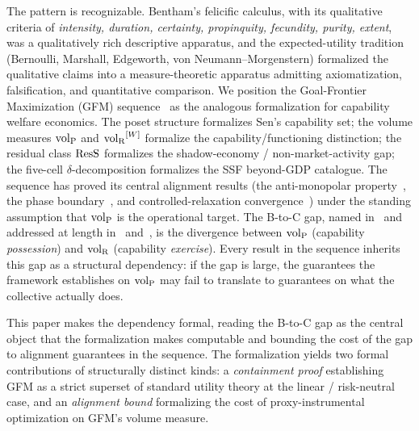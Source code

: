 The pattern is recognizable.  Bentham's felicific
calculus, with its qualitative criteria of \emph{intensity,
duration, certainty, propinquity, fecundity, purity, extent},
was a qualitatively rich descriptive apparatus, and the expected-utility tradition (Bernoulli,
Marshall, Edgeworth, von Neumann--Morgenstern) formalized the
qualitative claims into a measure-theoretic apparatus admitting
axiomatization, falsification, and quantitative comparison.  We
position the Goal-Frontier Maximization (GFM)
sequence~\citep{lasser2026gfm,lasser2026poset,lasser2026horizon,lasser2026scm,lasser2026exo,lasser2026phase,lasser2026wamura,lasser2026paper8a,lasser2026paper8b}
as the analogous formalization for capability welfare economics.
The poset structure formalizes Sen's capability set; the volume
measures ${\operatorname{vol}_{\mathrm{P}}}$ and ${\operatorname{vol}_{\mathrm{R}}}^{[W]}$ formalize the capability/functioning
distinction; the residual class $\mathrm{ResS}$ formalizes the
shadow-economy / non-market-activity gap; the five-cell
$\delta$-decomposition formalizes the SSF beyond-GDP catalogue.
The sequence has proved its central alignment results (the
anti-monopolar property~\citep[Horizon~Aware]{lasser2026horizon},
the phase boundary~\citep[Phase~Redundancy]{lasser2026phase}, and
controlled-relaxation
convergence~\citep[Controlled~Relaxation]{lasser2026wamura}) under
the standing assumption that ${\operatorname{vol}_{\mathrm{P}}}$ is the operational target.
The B-to-C gap, named in~\citep[Section~7]{lasser2026gfm} and
addressed at length in~\citep[Revealed~Sacrifice]{lasser2026paper8a}
and~\citep[Need~Sufficiency]{lasser2026paper8b}, is the divergence
between ${\operatorname{vol}_{\mathrm{P}}}$ (capability \emph{possession}) and ${\operatorname{vol}_{\mathrm{R}}}$
(capability \emph{exercise}).  Every result in the sequence
inherits this gap as a structural dependency: if the gap is large,
the guarantees the framework establishes on ${\operatorname{vol}_{\mathrm{P}}}$ may fail to
translate to guarantees on what the collective actually does.

This paper makes the dependency formal, reading the B-to-C gap
as the central object that the formalization makes computable
and bounding the cost of the gap to alignment guarantees in the
sequence.  The formalization yields two formal contributions of
structurally distinct kinds: a \emph{containment proof}
establishing GFM as a strict superset of standard utility theory
at the linear / risk-neutral case, and an \emph{alignment bound}
formalizing the cost of proxy-instrumental optimization on GFM's
volume measure.

